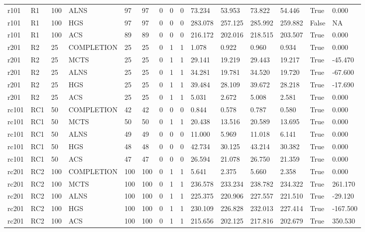 \begin{tabular}{lllllllllllllll}
r101 & R1 & 100 & ALNS & 97 & 97 & 0 & 0 & 0 & 73.234 & 53.953 & 73.822 & 54.446 & True & 0.000 \\
r101 & R1 & 100 & HGS & 97 & 97 & 0 & 0 & 0 & 283.078 & 257.125 & 285.992 & 259.882 & False & NA \\
r101 & R1 & 100 & ACS & 89 & 89 & 0 & 0 & 0 & 216.172 & 202.016 & 218.515 & 203.507 & True & 0.000 \\
r201 & R2 & 25 & COMPLETION & 25 & 25 & 0 & 1 & 1 & 1.078 & 0.922 & 0.960 & 0.934 & True & 0.000 \\
r201 & R2 & 25 & MCTS & 25 & 25 & 0 & 1 & 1 & 29.141 & 19.219 & 29.443 & 19.217 & True & -45.470 \\
r201 & R2 & 25 & ALNS & 25 & 25 & 0 & 1 & 1 & 34.281 & 19.781 & 34.520 & 19.720 & True & -67.600 \\
r201 & R2 & 25 & HGS & 25 & 25 & 0 & 1 & 1 & 39.484 & 28.109 & 39.672 & 28.218 & True & -17.690 \\
r201 & R2 & 25 & ACS & 25 & 25 & 0 & 1 & 1 & 5.031 & 2.672 & 5.008 & 2.581 & True & 0.000 \\
rc101 & RC1 & 50 & COMPLETION & 42 & 42 & 0 & 0 & 0 & 0.844 & 0.578 & 0.787 & 0.580 & True & 0.000 \\
rc101 & RC1 & 50 & MCTS & 50 & 50 & 0 & 1 & 1 & 20.438 & 13.516 & 20.589 & 13.695 & True & 0.000 \\
rc101 & RC1 & 50 & ALNS & 49 & 49 & 0 & 0 & 0 & 11.000 & 5.969 & 11.018 & 6.141 & True & 0.000 \\
rc101 & RC1 & 50 & HGS & 48 & 48 & 0 & 0 & 0 & 42.734 & 30.125 & 43.214 & 30.382 & True & 0.000 \\
rc101 & RC1 & 50 & ACS & 47 & 47 & 0 & 0 & 0 & 26.594 & 21.078 & 26.750 & 21.359 & True & 0.000 \\
rc201 & RC2 & 100 & COMPLETION & 100 & 100 & 0 & 1 & 1 & 5.641 & 2.375 & 5.660 & 2.358 & True & 0.000 \\
rc201 & RC2 & 100 & MCTS & 100 & 100 & 0 & 1 & 1 & 236.578 & 233.234 & 238.782 & 234.322 & True & 261.170 \\
rc201 & RC2 & 100 & ALNS & 100 & 100 & 0 & 1 & 1 & 225.375 & 220.906 & 227.557 & 221.510 & True & -29.120 \\
rc201 & RC2 & 100 & HGS & 100 & 100 & 0 & 1 & 1 & 230.109 & 226.828 & 232.013 & 227.414 & True & -167.500 \\
rc201 & RC2 & 100 & ACS & 100 & 100 & 0 & 1 & 1 & 215.656 & 202.125 & 217.816 & 202.679 & True & 350.530 \\
\hline
\end{tabular}
